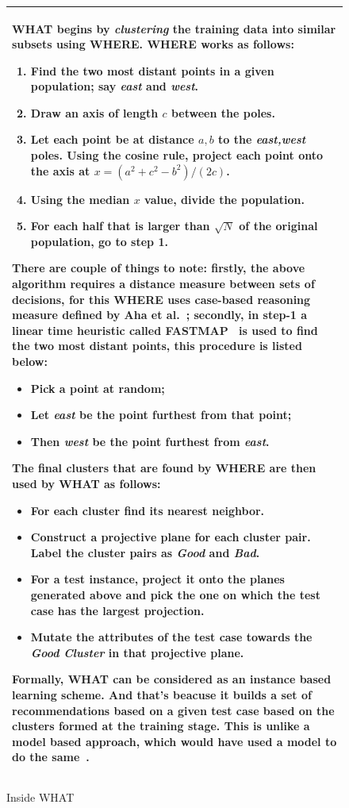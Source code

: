 \documentclass[conference]{IEEEtran}
\begin{document}
\begin{figure}[htbp!]
\small
\begin{tabular}{|p{.95\linewidth}|}\hline
WHAT begins by \textit{clustering} the training data into similar subsets using WHERE. WHERE works as follows:
\begin{enumerate}
\item Find the two most distant points in a given population; say {\em east} and {\em west}. 
\item Draw an axis of length $c$ between the poles. 
\item Let each point be at distance $a,b$ to the {\em east,west} poles.  Using the cosine rule, project each point onto the  axis  at $x=(a^2 + c^2 - b^2)/(2c)$.  
\item Using the median $x$ value, divide the population.
\item For each half that is larger than $\sqrt{N}$ of the original population, go to step 1.
\end{enumerate}

There are couple of things to note: firstly, the above algorithm requires a distance measure between sets of decisions, for this WHERE uses case-based reasoning measure defined by Aha et al.~\cite{aha91}; secondly, in step-1 a linear time heuristic called FASTMAP~\cite{fastmap} is used to find the two most distant points, this procedure is listed below:
\begin{itemize}
\item Pick a point at random; 
\item Let {\em east} be the point furthest from that point; 
\item Then {\em west} be the point furthest from {\em east}.
\end{itemize}

The final clusters that are found by WHERE are then used by WHAT as follows:
\begin{itemize}
\item For each cluster find its nearest neighbor.
\item Construct a projective plane for each cluster pair. Label the cluster pairs as {\em Good} and {\em Bad}.
\item For a test instance, project it onto the planes generated above and pick the one on which the test case has the largest projection.
\item Mutate the attributes of the test case towards the {\em Good Cluster} in that projective plane. 
\end{itemize}

Formally, WHAT can be considered as an instance based  learning scheme. And that's beacuse it builds a set of recommendations based on a given test case based on the clusters formed at the training stage. This is unlike a model based approach, which would have used a model to do the same~\cite{xomo}.
\\\hline
\end{tabular}
\caption{Inside WHAT}\label{fig:what}
\end{figure}
\end{document}
